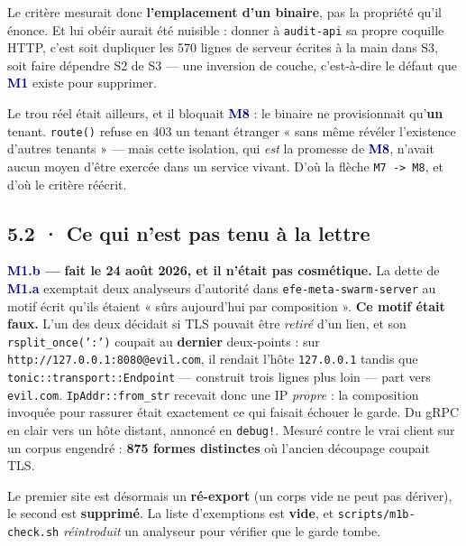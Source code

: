 \documentclass[10pt]{article}
\newcommand{\code}[1]{\texttt{\small #1}}
\newcommand{\mm}[1]{\textbf{\textcolor{navy}{#1}}}
\begin{document}
Le critère mesurait donc \textbf{l'emplacement d'un binaire}, pas la propriété qu'il énonce. Et lui
obéir aurait été nuisible : donner à \code{audit-api} sa propre coquille HTTP, c'est soit dupliquer
les 570 lignes de serveur écrites à la main dans S3, soit faire dépendre S2 de S3 --- une inversion
de couche, c'est-à-dire le défaut que \mm{M1} existe pour supprimer.

Le trou réel était ailleurs, et il bloquait \mm{M8} : le binaire ne provisionnait qu'\textbf{un}
tenant. \code{route()} refuse en 403 un tenant étranger « sans même révéler l'existence d'autres
tenants » --- mais cette isolation, qui \emph{est} la promesse de \mm{M8}, n'avait aucun moyen
d'être exercée dans un service vivant. D'où la flèche \code{M7 -> M8}, et d'où le critère réécrit.

\subsection{5.2 · Ce qui n'est pas tenu à la lettre}

\begin{acquis}
\textbf{\mm{M1.b} --- fait le 24 août 2026, et il n'était pas cosmétique.} La dette de \mm{M1.a}
exemptait deux analyseurs d'autorité dans \code{efe-meta-swarm-server} au motif écrit qu'ils étaient
« sûrs aujourd'hui par composition ». \textbf{Ce motif était faux.} L'un des deux décidait si TLS
pouvait être \emph{retiré} d'un lien, et son \code{rsplit\_once(':')} coupait au \textbf{dernier}
deux-points : sur \code{http://127.0.0.1:8080@evil.com}, il rendait l'hôte \code{127.0.0.1} tandis
que \code{tonic::transport::Endpoint} --- construit trois lignes plus loin --- part vers
\code{evil.com}. \code{IpAddr::from\_str} recevait donc une IP \emph{propre} : la composition
invoquée pour rassurer était exactement ce qui faisait échouer le garde. Du gRPC en clair vers un
hôte distant, annoncé en \code{debug!}. Mesuré contre le vrai client sur un corpus engendré :
\textbf{875 formes distinctes} où l'ancien découpage coupait TLS.

Le premier site est désormais un \textbf{ré-export} (un corps vide ne peut pas dériver), le second
est \textbf{supprimé}. La liste d'exemptions est \textbf{vide}, et \code{scripts/m1b-check.sh}
\emph{réintroduit} un analyseur pour vérifier que le garde tombe.
\end{acquis}
\end{document}
